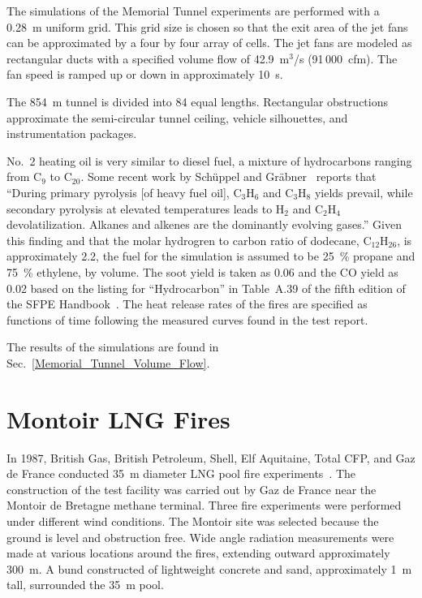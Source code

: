 The simulations of the Memorial Tunnel experiments are performed with a 0.28~m uniform grid. This grid size is chosen so that the exit area of the jet fans can be approximated by a four by four array of cells. The jet fans are modeled as rectangular ducts with a specified volume flow of 42.9~m$^3$/s (91\,000~cfm). The fan speed is ramped up or down in approximately 10~s.

The 854~m tunnel is divided into 84 equal lengths. Rectangular obstructions approximate the semi-circular tunnel ceiling, vehicle silhouettes, and instrumentation packages.

No.~2 heating oil is very similar to diesel fuel, a mixture of hydrocarbons ranging from C$_9$ to C$_{20}$. Some recent work by Sch\"{u}ppel and Gr\"{a}bner~\cite{Schuppel:JAAP2024} reports that ``During primary pyrolysis [of heavy fuel oil], C$_3$H$_6$ and C$_3$H$_8$ yields prevail, while secondary pyrolysis at elevated temperatures leads to H$_2$ and C$_2$H$_4$ devolatilization. Alkanes and alkenes are the dominantly evolving gases.'' Given this finding and that the molar hydrogren to carbon ratio of dodecane, C$_{12}$H$_{26}$, is approximately 2.2, the fuel for the simulation is assumed to be 25~\% propane and 75~\% ethylene, by volume. The soot yield is taken as 0.06 and the CO yield as 0.02 based on the listing for ``Hydrocarbon'' in Table~A.39 of the fifth edition of the SFPE Handbook~\cite{SFPE}. The heat release rates of the fires are specified as functions of time following the measured curves found in the test report.

The results of the simulations are found in Sec.~\ref{Memorial_Tunnel_Volume_Flow}.


\section{Montoir LNG Fires}
\label{Montoir_LNG_Fires_Description}

In 1987, British Gas, British Petroleum, Shell, Elf Aquitaine, Total CFP, and Gaz de France conducted 35~m diameter LNG pool fire experiments~\cite{Nedelka:1990}. The construction of the test facility was carried out by Gaz de France near the Montoir de Bretagne methane terminal. Three fire experiments were performed under different wind conditions. The Montoir site was selected because the ground is level and obstruction free. Wide angle radiation measurements were made at various locations around the fires, extending outward approximately 300~m. A bund constructed of lightweight concrete and sand, approximately 1~m tall, surrounded the 35~m pool.

